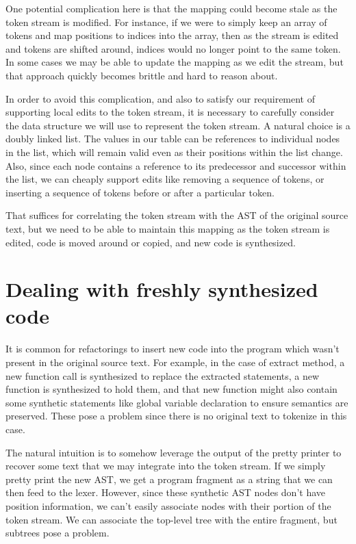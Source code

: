 One potential complication here is that the mapping could become stale as the
token stream is modified. For instance, if we were to simply keep an array of
tokens and map positions to indices into the array, then as the stream is
edited and tokens are shifted around, indices would no longer point to the same
token. In some cases we may be able to update the mapping as we edit the
stream, but that approach quickly becomes brittle and hard to reason about.

In order to avoid this complication, and also to satisfy our requirement of
supporting local edits to the token stream, it is necessary to carefully
consider the data structure we will use to represent the token stream. A
natural choice is a doubly linked list. The values in our table can be
references to individual nodes in the list, which will remain valid even as
their positions within the list change. Also, since each node contains a
reference to its predecessor and successor within the list, we can cheaply
support edits like removing a sequence of tokens, or inserting a sequence of
tokens before or after a particular token.

That suffices for correlating the token stream with the AST of the original
source text, but we need to be able to maintain this mapping as the token
stream is edited, code is moved around or copied, and new code is synthesized.

\section{Dealing with freshly synthesized code}

It is common for refactorings to insert new code into the program which wasn't
present in the original source text. For example, in the case of extract
method, a new function call is synthesized to replace the extracted statements,
a new function is synthesized to hold them, and that new function might also
contain some synthetic statements like global variable declaration to ensure
semantics are preserved. These pose a problem since there is no original text
to tokenize in this case.

The natural intuition is to somehow leverage the output of the pretty printer
to recover some text that we may integrate into the token stream. If we simply
pretty print the new AST, we get a program fragment as a string that we can
then feed to the lexer. However, since these synthetic AST nodes don't have
position information, we can't easily associate nodes with their portion of the
token stream. We can associate the top-level tree with the entire fragment, but
subtrees pose a problem.

